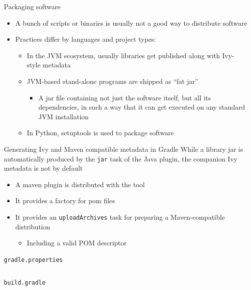 \documentclass[presentation]{beamer}
\newcommand{\codefile}[4]{
	\begin{block}{\texttt{#2}}
		\inputminted[fontsize=#3,linenos=true,breaklines=true]{#4}{"workspace/#1/#2"}
	\end{block}
}
\newcommand{\kotlin}[3]{\codefile{#1}{#2}{#3}{kotlin}}
\newcommand{\tinier}{\fontsize{4pt}{5pt}\selectfont}
\begin{document}
\begin{frame}[fragile]{Packaging software}
    \begin{itemize}
        \item A bunch of scripts or binaries is usually not a good way to distribute software
        \item Practices differ by languages and project types:
        \begin{itemize}
            \item In the JVM ecosystem, usually libraries get published along with Ivy-style metadata
            \item JVM-based stand-alone programs are shipped as ``fat jar''
            \begin{itemize}
                \item A jar file containing not just the software itself, but all its dependencies, in such a way that it can get executed on any standard JVM installation
            \end{itemize}
            \item In Python, setuptools is used to package software
        \end{itemize}
    \end{itemize}
\end{frame}

\begin{frame}{Generating Ivy and Maven compatible metadata in Gradle}
    While a library jar is automatically produced by the \texttt{jar} task of the Java plugin, the companion Ivy metadata is not by default
    \begin{itemize}
        \item A maven plugin is distributed with the tool
        \item It provides a factory for pom files
        \item It provides an \texttt{uploadArchives} task for preparing a Maven-compatible distribution
        \begin{itemize}
            \item Including a valid POM descriptor
        \end{itemize}
    \end{itemize}
    \kotlin{23-POM}{gradle.properties}{\scriptsize}
    \kotlin{23-POM}{build.gradle}{\tinier}
\end{frame}
\end{document}
